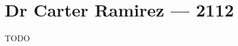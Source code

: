 \hypertarget{dr-carter-ramirez-2112}{%
\chapter*{Dr Carter Ramirez — 2112}\label{dr-carter-ramirez-2112}}

TODO
